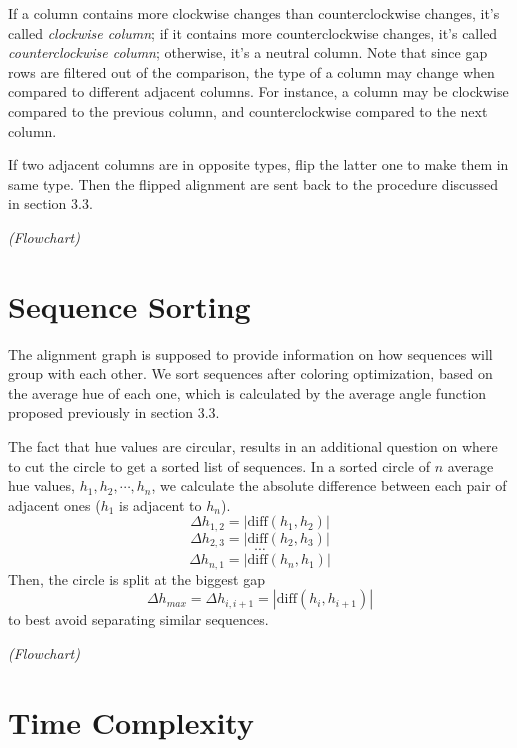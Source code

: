 If a column contains more clockwise changes than counterclockwise changes, it's called \emph{clockwise column}; if it contains more counterclockwise changes, it's called \emph{counterclockwise column}; otherwise, it's a neutral column. Note that since gap rows are filtered out of the comparison, the type of a column may change when compared to different adjacent columns. For instance, a column may be clockwise compared to the previous column, and counterclockwise compared to the next column.

If two adjacent columns are in opposite types, flip the latter one to make them in same type. Then the flipped alignment are sent back to the procedure discussed in section 3.3.

\emph{(Flowchart)}

\section{Sequence Sorting}

The alignment graph is supposed to provide information on how sequences will group with each other. We sort sequences after coloring optimization, based on the average hue of each one, which is calculated by the average angle function proposed previously in section 3.3.

The fact that hue values are circular, results in an additional question on where to cut the circle to get a sorted list of sequences. In a sorted circle of $n$ average hue values, $h_1,h_2,\cdots,h_n$, we calculate the absolute difference between each pair of adjacent ones ($h_1$ is adjacent to $h_n$). $$\Delta h_{1,2}=|\mathrm{diff}(h_1,h_2)|$$ $$\Delta h_{2,3}=|\mathrm{diff}(h_2,h_3)|$$ $$\cdots$$ $$\Delta h_{n,1}=|\mathrm{diff}(h_n,h_1)|$$ Then, the circle is split at the biggest gap $$\Delta h_{max}=\Delta h_{i,i+1}=|\mathrm{diff}(h_i,h_{i+1})|$$ to best avoid separating similar sequences.

\emph{(Flowchart)}

\section{Time Complexity}
